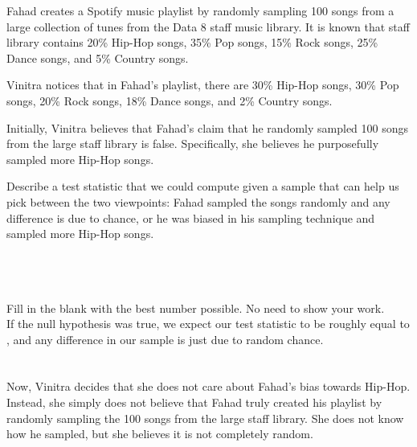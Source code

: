 
Fahad creates a Spotify music playlist by randomly sampling 100 songs from a large collection of tunes from the Data 8 staff music library. It is known that staff library contains 20\% Hip-Hop songs, 35\% Pop songs, 15\% Rock songs, 25\% Dance songs, and 5\% Country songs. 

Vinitra notices that in Fahad's playlist, there are 30\% Hip-Hop songs, 30\% Pop songs, 20\% Rock songs, 18\% Dance songs, and 2\% Country songs. 

Initially, Vinitra believes that Fahad's claim that he randomly sampled 100 songs from the large staff library is false. Specifically, she believes he purposefully sampled more Hip-Hop songs. 
\begin{enumerate}
 Describe a test statistic that we could compute given a sample that can help us pick between the two viewpoints: Fahad sampled the songs randomly and any difference is due to chance, or he was biased in his sampling technique and sampled more Hip-Hop songs. \\ \\ \\ \\ 

 Fill in the blank with the best number possible. No need to show your work. \\
If the null hypothesis was true, we expect our test statistic to be roughly equal to \underline{\hspace{3cm}}, and any difference in our sample is just due to random chance. \\ \\
 \\
Now, Vinitra decides that she does not care about Fahad's bias towards Hip-Hop. Instead, she simply does not believe that Fahad truly created his playlist by randomly sampling the 100 songs from the large staff library. She does not know how he sampled, but she believes it is not completely random. \\ 


\end{enumerate}

